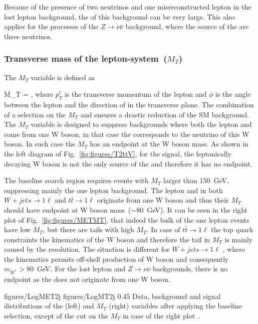 Because of the presence of two neutrinos and one misreconstructed lepton in the lost lepton background, the \MET of this background can be very large. This also applies for the processes of the $Z \to \nu \bar{\nu}$ background, where the source of the \MET are three neutrinos.

\subsubsection{Transverse mass of the lepton-\MET system~($M_{T}$)}

The $M_{T}$ variable is defined as

{
 M_{T} =  ,
}
where $p_{T}^{\ell}$ is the transverse momentum of the lepton and $\phi$ is the angle between the lepton and the direction of \MET in the transverse plane. The combination of a selection on the $M_{T}$ and \MET ensures a drastic reduction of the SM background. The $M_{T}$ variable is  designed to suppress backgrounds where both the lepton and \MET come from one W boson, in that case the \MET corresponds to the neutrino of this W boson. In such case the $M_{T}$ has an endpoint at the W boson mass. As shown in the left diagram of Fig.~\ref{fig:figures/T2ttV}, for the signal, the leptonically decaying W boson is not the only source of the \MET and therefore it has no endpoint.


The baseline search region requires events with $M_{T}$ larger than 150~GeV, suppressing mainly the one lepton background. The lepton and \MET in both  $W+jets \to 1\ell$  and $t \bar{t} \to 1\ell$ originate from one W boson and thus their $M_{T}$ should have endpoint at W boson mass~($\sim$80~GeV). It can be seen in the right plot of Fig.~\ref{fig:figures/METMT}, that indeed the bulk of the one lepton events have low $M_{T}$, but there are tails with high $M_{T}$. In case of $t \bar{t} \to 1\ell$ the top quark constraints the kinematics of the W boson and therefore the tail in $M_{T}$  is mainly caused by the \MET resolution. The situation is different for $W+jets \to 1\ell$ , where the kinematics permits off-shell production of W boson and consequently $m_{W^{*}}> 80$~GeV. For the lost lepton and $Z \to \nu \bar{\nu}$ backgrounds, there is no endpoint as the \MET does not originate from one W boson.

                 {figures/LogMET2j} %
                 {figures/LogMT2j} %
                 {0.45}       %
                 { Data, background and signal distributions of the \MET (left) and $M_{T}$ (right) variables after applying the baseline selection, except of the cut on the $M_{T}$ in case of the right plot~\cite{website:stopSupp}. }

